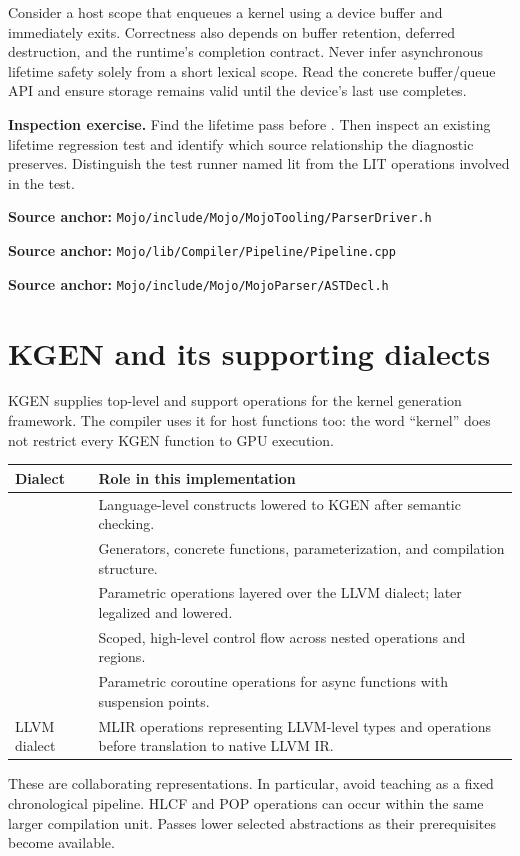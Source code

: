 \documentclass[11pt,a4paper]{article}
\newcommand{\code}[1]{\texttt{\detokenize{#1}}}
\newcommand{\src}[1]{\par{\small\textbf{Source anchor:} \nolinkurl{#1}}\par}
\newcommand{\chapterpage}[1]{\clearpage\section{#1}}
\begin{document}
Consider a host scope that enqueues a kernel using a device buffer and immediately exits. Correctness also depends on buffer retention, deferred destruction, and the runtime's completion contract. Never infer asynchronous lifetime safety solely from a short lexical scope. Read the concrete buffer/queue API and ensure storage remains valid until the device's last use completes.

\textbf{Inspection exercise.} Find the lifetime pass before \code{createLowerLIT}. Then inspect an existing lifetime regression test and identify which source relationship the diagnostic preserves. Distinguish the test runner named lit from the LIT operations involved in the test.
\src{Mojo/include/Mojo/MojoTooling/ParserDriver.h}
\src{Mojo/lib/Compiler/Pipeline/Pipeline.cpp}
\src{Mojo/include/Mojo/MojoParser/ASTDecl.h}

\chapterpage{KGEN and its supporting dialects}
KGEN supplies top-level and support operations for the kernel generation framework. The compiler uses it for host functions too: the word ``kernel'' does not restrict every KGEN function to GPU execution.

\begin{tabularx}{\linewidth}{@{}p{22mm}X@{}}
\toprule
Dialect & Role in this implementation\\\midrule
\code{lit} & Language-level constructs lowered to KGEN after semantic checking.\\
\code{kgen} & Generators, concrete functions, parameterization, and compilation structure.\\
\code{pop} & Parametric operations layered over the LLVM dialect; later legalized and lowered.\\
\code{hlcf} & Scoped, high-level control flow across nested operations and regions.\\
\code{co} & Parametric coroutine operations for async functions with suspension points.\\
LLVM dialect & MLIR operations representing LLVM-level types and operations before translation to native LLVM IR.\\\bottomrule
\end{tabularx}

These are collaborating representations. In particular, avoid teaching \code{LIT -> HLCF -> POP -> KGEN} as a fixed chronological pipeline. HLCF and POP operations can occur within the same larger compilation unit. Passes lower selected abstractions as their prerequisites become available.
\end{document}
